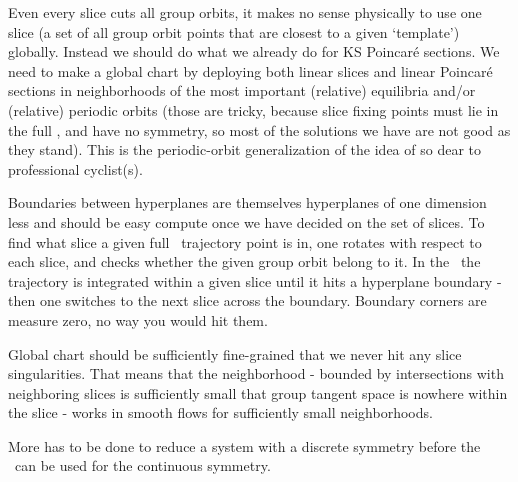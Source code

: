 Even every slice cuts all group orbits, it makes no sense physically to
use one slice
(a set of all group orbit points that are closest to a given `template')
globally. Instead we should do what we already do for KS Poincar\'e sections.
We need to make a global chart by deploying both linear slices and linear
Poincar\'e sections in neighborhoods of the most important (relative)
equilibria and/or (relative) periodic orbits (those are tricky, because
slice fixing points must lie in the full \statesp, and have no symmetry,
so most of the solutions we have are not good as they stand). This is the
periodic-orbit generalization of the idea of
so dear to professional cyclist(s).


Boundaries
between hyperplanes are themselves hyperplanes of one dimension less and
should be easy compute once we have decided on the set of slices. To find
what slice a given full \statesp\ trajectory point is in, one rotates
with respect to each slice, and checks whether the given group orbit
belong to it. In the \reducedsp\ the trajectory is integrated within a
given slice until it hits a hyperplane boundary - then one switches to
the next slice across the boundary. Boundary corners are measure zero, no
way you would hit them.

Global chart should be sufficiently fine-grained that we never hit any
slice singularities. That means that the neighborhood - bounded by
intersections with neighboring slices is sufficiently small that group
tangent space is nowhere within the slice - works in smooth flows
for sufficiently small neighborhoods.


More has to be done to reduce a system with a discrete
symmetry before the \mslices\ can be used for the continuous symmetry.
